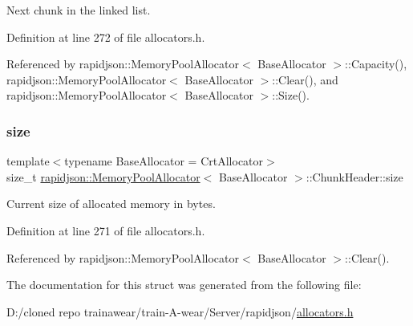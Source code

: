 Next chunk in the linked list. 



Definition at line 272 of file allocators.\+h.



Referenced by rapidjson\+::\+Memory\+Pool\+Allocator$<$ Base\+Allocator $>$\+::\+Capacity(), rapidjson\+::\+Memory\+Pool\+Allocator$<$ Base\+Allocator $>$\+::\+Clear(), and rapidjson\+::\+Memory\+Pool\+Allocator$<$ Base\+Allocator $>$\+::\+Size().

\mbox{\label{structrapidjson_1_1_memory_pool_allocator_1_1_chunk_header_a585b07316f4ff3e9475608d8a0812bb3}} 
\subsubsection{\texorpdfstring{size}{size}}
{\footnotesize\ttfamily template$<$typename Base\+Allocator = Crt\+Allocator$>$ \\
size\+\_\+t \mbox{\hyperlink{classrapidjson_1_1_memory_pool_allocator}{rapidjson\+::\+Memory\+Pool\+Allocator}}$<$ Base\+Allocator $>$\+::Chunk\+Header\+::size}



Current size of allocated memory in bytes. 



Definition at line 271 of file allocators.\+h.



Referenced by rapidjson\+::\+Memory\+Pool\+Allocator$<$ Base\+Allocator $>$\+::\+Clear().



The documentation for this struct was generated from the following file\+:\begin{DoxyCompactItemize}
\item 
D\+:/cloned repo trainawear/train-\/\+A-\/wear/\+Server/rapidjson/\mbox{\hyperlink{allocators_8h}{allocators.\+h}}\end{DoxyCompactItemize}
